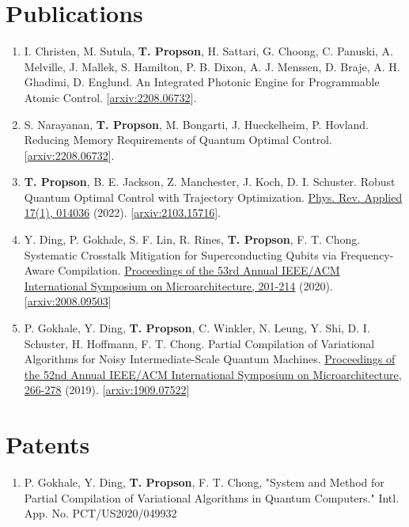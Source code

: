 \documentclass[letterpaper, 11pt]{article}
\begin{document}
\section{Publications}
\begin{enumerate}
\item I. Christen, M. Sutula, \textbf{T. Propson}, H. Sattari, G. Choong, C. Panuski, A. Melville, J. Mallek,
  S. Hamilton, P. B. Dixon, A. J. Menssen, D. Braje, A. H. Ghadimi, D. Englund.
  An Integrated Photonic Engine for Programmable Atomic Control.
  [\href{https://arxiv.org/abs/2208.06732}{arxiv:2208.06732}].
\item S. Narayanan, \textbf{T. Propson}, M. Bongarti, J. Hueckelheim, P. Hovland.
  Reducing Memory Requirements of Quantum Optimal Control.
  [\href{https://arxiv.org/abs/2203.12717}{arxiv:2208.06732}].
\item \textbf{T. Propson}, B. E. Jackson, Z. Manchester, J. Koch, D. I. Schuster. Robust Quantum
  Optimal Control with Trajectory Optimization.
  \href{https://journals.aps.org/prapplied/abstract/10.1103/PhysRevApplied.17.014036}{
    Phys. Rev. Applied 17(1), 014036} (2022).
  [\href{https://arxiv.org/abs/2103.15716}{arxiv:2103.15716}].
\item Y. Ding, P. Gokhale, S. F. Lin, R. Rines, \textbf{T. Propson}, F. T. Chong.
  Systematic Crosstalk Mitigation for Superconducting Qubits via Frequency-Aware Compilation.
  \href{https://ieeexplore.ieee.org/document/9251858}{Proceedings of the 53rd Annual
  IEEE/ACM International Symposium on Microarchitecture, 201-214} (2020).
       [\href{https://arxiv.org/abs/2008.09503}{arxiv:2008.09503}]
\item P. Gokhale, Y. Ding, \textbf{T. Propson}, C. Winkler, N. Leung, Y. Shi,
  D. I. Schuster, H. Hoffmann, F. T. Chong.
  Partial Compilation of Variational Algorithms for Noisy Intermediate-Scale Quantum Machines.
  \href{https://doi.org/10.1145/3352460.3358313}{Proceedings of the 52nd Annual
    IEEE/ACM International Symposium on Microarchitecture, 266-278} (2019).
       [\href{https://arxiv.org/abs/1909.07522}{arxiv:1909.07522}]
\end{enumerate}

\section{Patents}
\begin{enumerate}
  \item P. Gokhale, Y. Ding, \textbf{T. Propson}, F. T. Chong, "System and Method
    for Partial Compilation of Variational Algorithms in Quantum Computers." Intl. App. No. PCT/US2020/049932
\end{enumerate}
\end{document}

